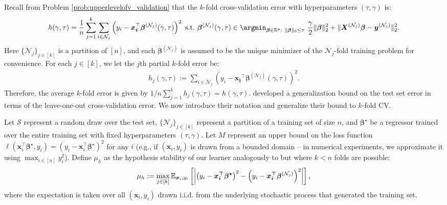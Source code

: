 \documentclass[mnsc,nonblindrev]{informs3} %
\begin{document}
Recall from Problem \eqref{prob:upperlevelofv_validation} that the $k$-fold cross-validation error with hyperparameters $(\tau, \gamma)$ is:
{\color{black}
\begin{equation*}
h(\gamma,\tau) = \frac{1}{n}\sum_{j=1}^k \sum_{i \in \mathcal{N}_j}\left(y_i -\bm{x_i}^\top \bm{\beta}^{(\mathcal{N}_j)}(\gamma,\tau)\right)^2\
	\text{s.t.} \  \bm{\beta}^{(\mathcal{N}_j)}(\gamma, \tau) \in \argmin_{\bm{\beta} \in \mathbb{R}^p: \ \Vert \bm{\beta}\Vert_0 \leq \tau} \ \frac{\gamma}{2}\Vert \bm{\beta}\Vert_2^2 +\Vert \bm{X}^{(\mathcal{N}_j)}\bm{\beta}-\bm{y}^{(\mathcal{N}_j)}\Vert_2^2.%
\end{equation*}
Here $\{\mathcal{N}_j\}_{j \in [k]}$ is a partition of $[n]$, and each $\bm{\beta}^{(\mathcal{N}_j)}$ is assumed to be the unique minimizer of the $\mathcal{N}_j$-fold training problem for convenience. For each $j\in [k]$, we let the $j$th partial $k$-fold error be:
\begin{equation}
\begin{aligned}
\label{eq:partialLOOE}
h_j(\gamma, \tau):=\sum_{i \in \mathcal{N}_j}\left(y_i -\bm{x_i}^\top \bm{\beta}^{(\mathcal{N}_j)}(\gamma,\tau)\right)^2.
\end{aligned}
\end{equation}
Therefore, the average $k$-fold error is given by $1/n \sum_{j=1}^k h_j(\gamma, \tau)=h(\gamma, \tau)$. 
\citet{bousquet2002stability} developed a generalization bound on the test set error in terms of the leave-one-out cross-validation error. We now introduce their notation and generalize their bound to $k$-fold CV. }%

Let $\mathcal{S}$ represent a random draw over the test set, $\{\mathcal{N}_j\}_{j \in [k]}$ represent a partition of a training set of size $n$, and $\bm{\beta}^\star$ be a regressor trained over the entire training set with fixed hyperparameters $(\tau, \gamma)$. Let $M$ represent an upper bound on the loss function $\ell(\bm{x}_i^\top \bm{\beta}^\star, y_i)=(y_i-\bm{x}_i^\top \bm{\beta}^\star)^2$ for any $i$ (e.g., if $(\bm{x}_i, y_i)$ is drawn from a bounded domain -- in numerical experiments, we approximate it using $\max_{i \in [n]} y_i^2$). Define $\mu_h$ as the hypothesis stability of our learner analogously to \citep[][Definition 3]{bousquet2002stability} but where $k<n$ folds are possible:
\begin{align}\label{eq:hypothesisStability}\color{black}
\mu_h:=\max_{j \in [k]}\mathbb{E}_{\bm{x}_i, y_i}\left[\left\vert \left(y_i-\bm{x_i^\top\bm{\beta}^\star} \right)^2-\left(y_i-\bm{x_i^\top \beta}^{(\mathcal{N}_j)} \right)^2\right\vert\right],
\end{align}
where the expectation is taken over all $(\bm{x}_i, y_i)$ drawn i.i.d. from the underlying stochastic process that generated the training set.
\end{document}
